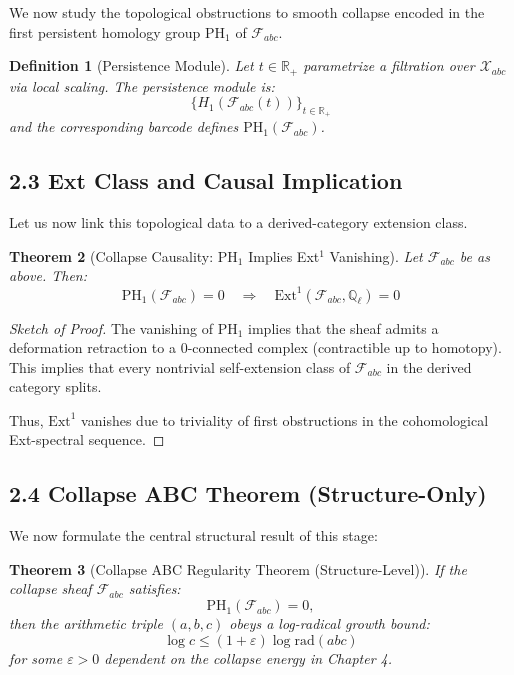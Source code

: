 \documentclass[11pt]{article}
\newtheorem{theorem}{Theorem}[section]
\newtheorem{definition}[theorem]{Definition}
\begin{document}
We now study the topological obstructions to smooth collapse encoded in the first persistent homology group $\mathrm{PH}_1$ of $\mathcal{F}_{abc}$.

\begin{definition}[Persistence Module]
Let $t \in \mathbb{R}_+$ parametrize a filtration over $\mathcal{X}_{abc}$ via local scaling. The persistence module is:
\[
\{ H_1(\mathcal{F}_{abc}(t)) \}_{t \in \mathbb{R}_+}
\]
and the corresponding barcode defines $\mathrm{PH}_1(\mathcal{F}_{abc})$.
\end{definition}

\subsection{2.3 Ext Class and Causal Implication}

Let us now link this topological data to a derived-category extension class.

\begin{theorem}[Collapse Causality: PH$_1$ Implies Ext$^1$ Vanishing]
Let $\mathcal{F}_{abc}$ be as above. Then:
\[
\mathrm{PH}_1(\mathcal{F}_{abc}) = 0 \quad \Rightarrow \quad \mathrm{Ext}^1(\mathcal{F}_{abc}, \mathbb{Q}_\ell) = 0
\]
\end{theorem}

\begin{proof}[Sketch of Proof]
The vanishing of $\mathrm{PH}_1$ implies that the sheaf admits a deformation retraction to a 0-connected complex (contractible up to homotopy). This implies that every nontrivial self-extension class of $\mathcal{F}_{abc}$ in the derived category splits.

Thus, $\mathrm{Ext}^1$ vanishes due to triviality of first obstructions in the cohomological Ext-spectral sequence.
\end{proof}

\subsection{2.4 Collapse ABC Theorem (Structure-Only)}

We now formulate the central structural result of this stage:

\begin{theorem}[Collapse ABC Regularity Theorem (Structure-Level)]
If the collapse sheaf $\mathcal{F}_{abc}$ satisfies:
\[
\mathrm{PH}_1(\mathcal{F}_{abc}) = 0,
\]
then the arithmetic triple $(a,b,c)$ obeys a log-radical growth bound:
\[
\log c \leq (1 + \varepsilon) \log \mathrm{rad}(abc)
\]
for some $\varepsilon > 0$ dependent on the collapse energy in Chapter 4.
\end{theorem}
\end{document}
